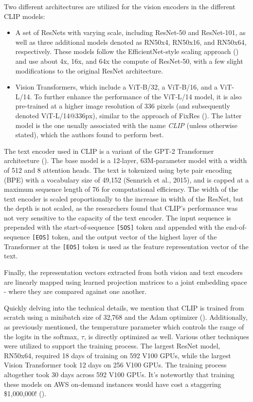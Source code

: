 \documentclass{article}
\begin{document}
Two different architectures are utilized for the vision encoders in the different CLIP models:
\begin{itemize}
    \item 
        A set of ResNets with varying scale, including ResNet-50 and ResNet-101, as well as three additional models denoted as RN50x4, RN50x16, and RN50x64, respectively. These models follow the EfficientNet-style scaling approach (\citet{tan2019efficientnet}) and use about 4x, 16x, and 64x the compute of ResNet-50, with a few slight modifications to the original ResNet architecture.
    \item
        Vision Transformers, which include a ViT-B/32, a ViT-B/16, and a ViT-L/14. To further enhance the performance of the ViT-L/14 model, it is also pre-trained at a higher image resolution of 336 pixels (and subsequently denoted ViT-L/14@336px), similar to the approach of FixRes (\citet{touvron2019fixing}). The latter model is the one usually associated with the name \emph{CLIP} (unless otherwise stated), which the authors found to perform best.
\end{itemize}

\medskip
\noindent
The text encoder used in CLIP is a variant of the GPT-2 Transformer architecture (\citet{radford2019gpt2}). The base model is a 12-layer, 63M-parameter model with a width of 512 and 8 attention heads. The text is tokenized using byte pair encoding (BPE) with a vocabulary size of 49,152 (Sennrich et al., 2015), and is capped at a maximum sequence length of 76 for computational efficiency. The width of the text encoder is scaled proportionally to the increase in width of the ResNet, but the depth is not scaled, as the researchers found that CLIP's performance was not very sensitive to the capacity of the text encoder. The input sequence is prepended with the start-of-sequence \texttt{[SOS]} token and appended with the end-of-sequence \texttt{[EOS]} token, and the output vector of the highest layer of the Transformer at the \texttt{[EOS]} token is used as the feature representation vector of the text. 

\medskip
\noindent
Finally, the representation vectors extracted from both vision and text encoders are linearly mapped using learned projection matrices to a joint embedding space - where they are compared against one another.

\medskip
\noindent
Quickly delving into the technical details, we mention that CLIP is trained from scratch using a minibatch size of 32,768 and the Adam optimizer (\citet{kingma2014adam}). Additionally, as previously mentioned, the temperature parameter which controls the range of the logits in the softmax, $\tau$, is directly optimized as well. Various other techniques were utilized to support the training process. The largest ResNet model, RN50x64, required 18 days of training on 592 V100 GPUs, while the largest Vision Transformer took 12 days on 256 V100 GPUs. The training process altogether took 30 days across 592 V100 GPUs. It's noteworthy that training these models on AWS on-demand instances would have cost a staggering \$1,000,000! (\citet{expensiveclip}).
\end{document}

